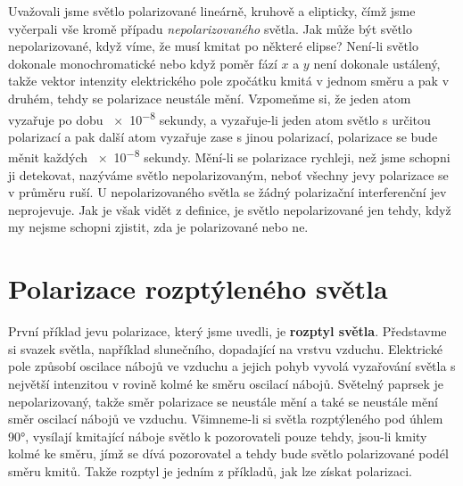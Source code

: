     Uvažovali jsme světlo polarizované lineárně, kruhově a elipticky, čímž jsme vyčerpali vše kromě
    případu \emph{nepolarizovaného} světla. Jak může být světlo nepolarizované, když víme, že musí
    kmitat po některé elipse? Není-li světlo dokonale monochromatické nebo když poměr fází \(x\) a
    \(y\) není dokonale ustálený, takže vektor intenzity elektrického pole zpočátku kmitá v jednom
    směru a pak v druhém, tehdy se polarizace neustále mění. Vzpomeňme si, že jeden atom vyzařuje po
    dobu \num{e-8} sekundy, a vyzařuje-li jeden atom světlo s určitou polarizací a pak další atom
    vyzařuje zase s jinou polarizací, polarizace se bude měnit každých \num{e-8} sekundy. Mění-li se
    polarizace rychleji, než jsme schopni ji detekovat, nazýváme světlo nepolarizovaným, neboť
    všechny jevy polarizace se v průměru ruší. U nepolarizovaného světla se žádný polarizační
    interferenční jev neprojevuje. Jak je však vidět z definice, je světlo nepolarizované jen tehdy,
    když my nejsme schopni zjistit, zda je polarizované nebo ne.

  \section{Polarizace rozptýleného světla}\label{fyz:IchapXXXIIIsecII}
    První příklad jevu polarizace, který jsme uvedli, je \textbf{rozptyl světla}. Představme si
    svazek světla, například slunečního, dopadající na vrstvu vzduchu. Elektrické pole způsobí
    oscilace nábojů ve vzduchu a jejich pohyb vyvolá vyzařování světla s největší intenzitou v
    rovině kolmé ke směru oscilací nábojů. Světelný paprsek je nepolarizovaný, takže směr polarizace
    se neustále mění a také se neustále mění směr oscilací nábojů ve vzduchu. Všimneme-li si světla
    rozptýleného pod úhlem \ang{90}, vysílají kmitající náboje světlo k pozorovateli pouze tehdy,
    jsou-li kmity kolmé ke směru, jímž se dívá pozorovatel a tehdy bude světlo polarizované podél
    směru kmitů. Takže rozptyl je jedním z příkladů, jak lze získat polarizaci.
  
